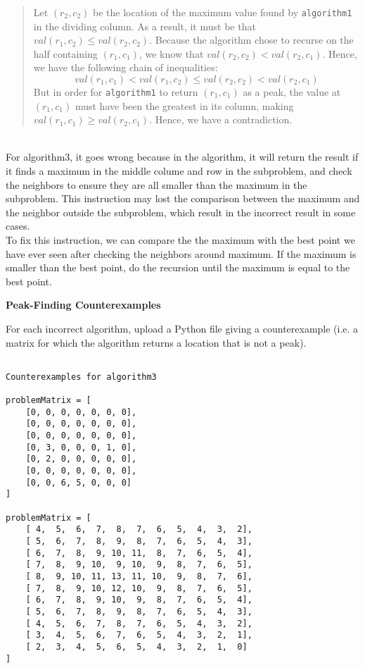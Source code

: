 \documentclass[12pt,twoside]{article}
\begin{document}
\begin{problems}
\begin{quote}
Let $(r_2, c_2)$ be
the location of the maximum value found by \texttt{algorithm1}
in the dividing column.
As a result, it must be that $val(r_1, c_2) \le val(r_2, c_2)$.
Because the algorithm chose to recurse
on the half containing $(r_1, c_1)$,
we know that $val(r_2, c_2) < val(r_2, c_1)$.
Hence, we have the following chain of inequalities:
$$val(r_1, c_1) < val(r_1, c_2) \le val(r_2, c_2) < val(r_2, c_1)$$
But in order for \texttt{algorithm1} to return $(r_1, c_1)$ as a peak,
the value at $(r_1, c_1)$ must have been the greatest in its column,
making $val(r_1, c_1) \ge val(r_2, c_1)$.
Hence, we have a contradiction.
\end{quote}

\ifsolution \solution{}
\\
For algorithm3,  it goes wrong because in the algorithm, it will return 
the result if it finds a maximum in the middle colume and row in the subproblem,
and check the neighbors to ensure they are all smaller than the maximum in the 
subproblem. This instruction may lost the comparison  between the maximum and the 
neighbor outside the subproblem, which result in the incorrect result in some cases.
\\
To fix this instruction, we can compare the the maximum with the best point we have 
ever seen after checking the neighbors around maximum. If the maximum is smaller than 
the best point, do the recursion until the maximum is equal to the best point.
\\
\fi

\problem {} \textbf{Peak-Finding Counterexamples}

For each incorrect algorithm,
upload a Python file giving a counterexample
(i.e. a matrix for which the algorithm returns a location
that is not a peak).

\ifsolution \solution{}
\begin{verbatim}

Counterexamples for algorithm3

problemMatrix = [
    [0, 0, 0, 0, 0, 0, 0],
    [0, 0, 0, 0, 0, 0, 0],
    [0, 0, 0, 0, 0, 0, 0],
    [0, 3, 0, 0, 0, 1, 0],
    [0, 2, 0, 0, 0, 0, 0],
    [0, 0, 0, 0, 0, 0, 0],
    [0, 0, 6, 5, 0, 0, 0]
]

problemMatrix = [
	[ 4,  5,  6,  7,  8,  7,  6,  5,  4,  3,  2],
	[ 5,  6,  7,  8,  9,  8,  7,  6,  5,  4,  3],
	[ 6,  7,  8,  9, 10, 11,  8,  7,  6,  5,  4],
	[ 7,  8,  9, 10,  9, 10,  9,  8,  7,  6,  5],
	[ 8,  9, 10, 11, 13, 11, 10,  9,  8,  7,  6],
	[ 7,  8,  9, 10, 12, 10,  9,  8,  7,  6,  5],
	[ 6,  7,  8,  9, 10,  9,  8,  7,  6,  5,  4],
	[ 5,  6,  7,  8,  9,  8,  7,  6,  5,  4,  3],
	[ 4,  5,  6,  7,  8,  7,  6,  5,  4,  3,  2],
	[ 3,  4,  5,  6,  7,  6,  5,  4,  3,  2,  1],
	[ 2,  3,  4,  5,  6,  5,  4,  3,  2,  1,  0]
]

\end{verbatim}
\fi

\end{problems}
\end{document}
